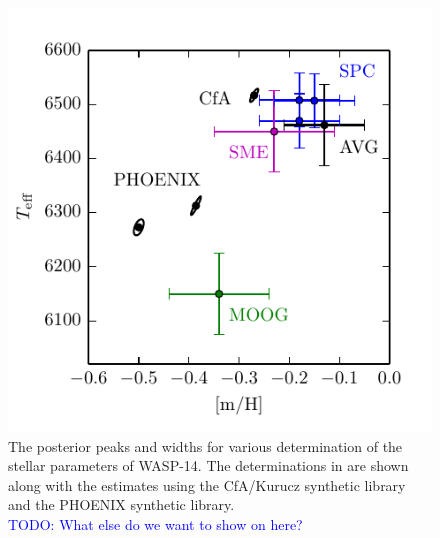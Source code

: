 \documentclass[iop,floatfix]{emulateapj}
\newcommand{\todo}[1]{ \textcolor{blue}{\\TODO: #1}}
\begin{document}
\begin{figure}[!htb]
\begin{center}
\includegraphics{figs/metacomparison.pdf}
\caption{The posterior peaks and widths for various determination of the stellar parameters of WASP-14. The determinations in \citet{torres12} are shown along with the estimates using the {\sc CfA/Kurucz} synthetic library and the {\sc PHOENIX} synthetic library. \todo{What else do we want to show on here?}}
\label{fig:metacomparison}
\end{center}
\end{figure}
\end{document}
